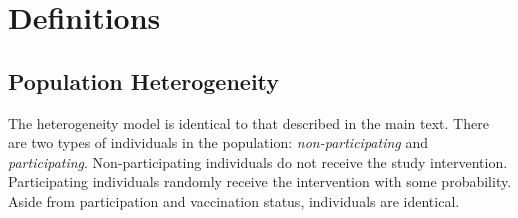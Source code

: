 \documentclass{article}
\begin{document}
\section{Definitions}

\subsection{Population Heterogeneity}

The heterogeneity model is identical to that described in the main text. There are two types of individuals in the population: {\em non-participating} and {\em participating}. Non-participating individuals do not receive the study intervention. Participating individuals randomly receive the intervention with some probability. Aside from participation and vaccination status, individuals are identical.
\end{document}
